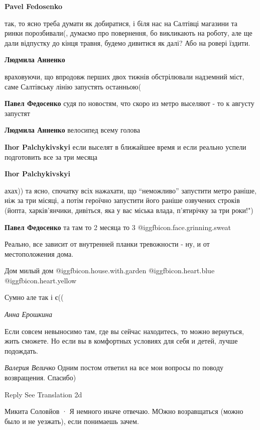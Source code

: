\begin{itemize}
\begin{itemize}
\textbf{Pavel Fedosenko} 

так, то ясно треба думати як добиратися, і біля нас на Салтівці магазини та
ринки порозбивали(, думаємо про повернення, бо викликають на роботу, але ще
дали відпустку до кінця травня, будемо дивитися як далі? Або на ровері їздити.

\textbf{Людмила Анненко} 

враховуючи, що впродовж перших двох тижнів обстрілювали надземний міст, саме
Салтівську лінію запустять останньою(

\textbf{Павел Федосенко} судя по новостям, что скоро из метро выселяют - то к августу запустят

\textbf{Людмила Анненко} велосипед всему голова

\textbf{Ihor Palchykivskyi} если выселят в ближайшее время и если реально успели подготовить все за три месяца

\textbf{Ihor Palchykivskyi} 

ахах)) та ясно, спочатку всіх нажахати, що \enquote{неможливо} запустити метро раніше,
ніж за три місяці, а потім героїчно запустити його раніше озвучених строків
(йопта, харків'янчики, дивіться, яка у вас міська влада, п'ятирічку за три
роки!")

\textbf{Павел Федосенко} та там то 2 месяца то 3  @igg{fbicon.face.grinning.sweat} 

Реально, все зависит от внутренней планки тревожности - ну, и от местоположения дома.
\end{itemize} %

Дом милый дом  @igg{fbicon.house.with.garden}  @igg{fbicon.heart.blue}  @igg{fbicon.heart.yellow} 

Сумно але так і є((

\emph{Анна Ерошкина}

Если совсем невыносимо там, где вы сейчас находитесь, то можно вернуться, жить
сможете. Но если вы в комфортных условиях для себя и детей, лучше подождать.

\emph{Валерия Величко}
Одним постом ответил на все мои вопросы по поводу возвращения. Спасибо)

    Reply
    See Translation
    2d

Микита Соловйов  ·
Я немного иначе отвечаю. МОжно возравщаться (можно было и не уезжать), если понимаешь зачем.

\end{itemize} %
